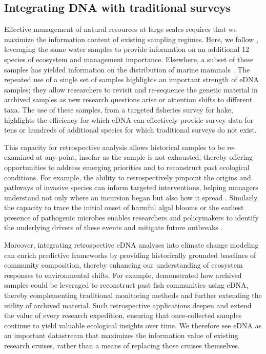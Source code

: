 \documentclass{article}
\begin{document}
\subsection*{Integrating DNA with traditional surveys}
Effective management of natural resources at large scales requires that we maximize the information content of existing sampling regimes. Here, we follow \cite{shelton2022}, leveraging the same water samples to provide information on an additional 12 species of ecosystem and management importance. Elsewhere, a subset of these samples has yielded information on the distribution of marine mammals \cite{valdiviacarrillo2025}. The repeated use of a single set of samples highlights an important strength of eDNA samples; they allow researchers to revisit and re-sequence the genetic material in archived samples as new research questions arise or attention shifts to different taxa. The use of these samples, from a targeted fisheries survey for hake, highlights the efficiency for which eDNA can effectively provide survey data for tens or hundreds of additional species for which traditional surveys do not exist. 

This capacity for retrospective analysis allows historical samples to be re-examined at any point, insofar as the sample is not exhausted, thereby offering opportunities to address emerging priorities and to reconstruct past ecological conditions. For example, the ability to retrospectively pinpoint the origins and pathways of invasive species can inform targeted interventions, helping managers understand not only where an incursion began but also how it spread \cite{gilbey2021}. Similarly, the capacity to trace the initial onset of harmful algal blooms or the earliest presence of pathogenic microbes enables researchers and policymakers to identify the underlying drivers of these events and mitigate future outbreaks \cite{shaw2019}. 

Moreover, integrating retrospective eDNA analyses into climate change modeling can enrich predictive frameworks by providing historically grounded baselines of community composition, thereby enhancing our understanding of ecosystem responses to environmental shifts. For example, \cite{diaz2020} demonstrated how archived samples could be leveraged to reconstruct past fish communities using eDNA, thereby complementing traditional monitoring methods and further extending the utility of archived material. Such retrospective applications deepen and extend the value of every research expedition, ensuring that once-collected samples continue to yield valuable ecological insights over time. We therefore see eDNA as an important datastream that maximizes the information value of existing research cruises, rather than a means of replacing those cruises themselves.
\end{document}
